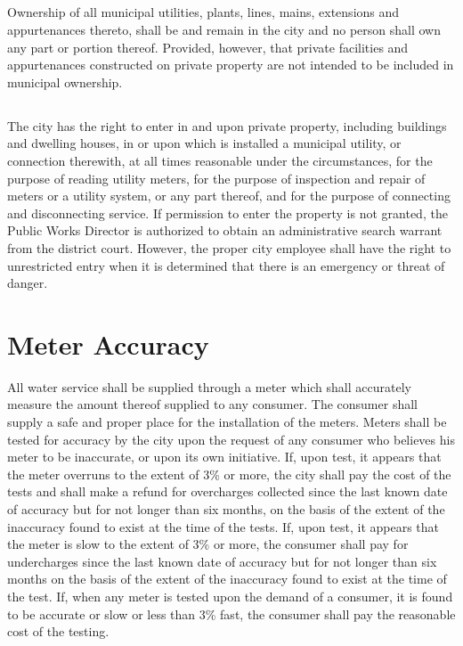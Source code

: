 \subsection{}
Ownership of all municipal utilities, plants, lines, mains, extensions and appurtenances thereto, shall be and remain in the city and no person shall own any part or portion thereof.  Provided, however, that private facilities and appurtenances constructed on private property are not intended to be included in municipal ownership.
\subsection{}
The city has the right to enter in and upon private property, including buildings and dwelling houses, in or upon which is installed a municipal utility, or connection therewith, at all times reasonable under the circumstances, for the purpose of reading utility meters, for the purpose of inspection and repair of meters or a utility system, or any part thereof, and for the purpose of connecting and disconnecting service.  If permission to enter the property is not granted, the Public Works Director is authorized to obtain an administrative search warrant from the district court.  However, the proper city employee shall have the right to unrestricted entry when it is determined that there is an emergency or threat of danger.

\section{Meter Accuracy}
All water service shall be supplied through a meter which shall accurately measure the amount thereof supplied to any consumer. The consumer shall supply a safe and proper place for the installation of the meters. Meters shall be tested for accuracy by the city upon the request of any consumer who believes his meter to be inaccurate, or upon its own initiative.  If, upon test, it appears that the meter overruns to the extent of 3\% or more, the city shall pay the cost of the tests and shall make a refund for overcharges collected since the last known date of accuracy but for not longer than six months, on the basis of the extent of the inaccuracy found to exist at the time of the tests.  If, upon test, it appears that the meter is slow to the extent of 3\% or more, the consumer shall pay for undercharges since the last known date of accuracy but for not longer than six months on the basis of the extent of the inaccuracy found to exist at the time of the test.  If, when any meter is tested upon the demand of a consumer, it is found to be accurate or slow or less than 3\% fast, the consumer shall pay the reasonable cost of the testing.

